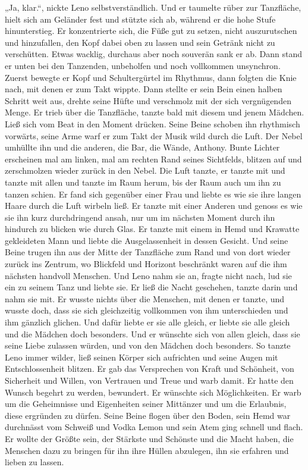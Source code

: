 \documentclass[ngerman,smalldemyvopaper,11pt,oneside,onecolumn,openright,extrafontsizes]{memoir}
\begin{document}
„Ja, klar.“, nickte Leno selbstverständlich. Und er taumelte rüber zur Tanzfläche, hielt sich am Geländer fest und stützte sich ab, während er die hohe Stufe hinunterstieg. Er konzentrierte sich, die Füße gut zu setzen, nicht auszurutschen und hinzufallen, den Kopf dabei oben zu lassen und sein Getränk nicht zu verschütten. Etwas wacklig, durchaus aber noch souverän sank er ab. Dann stand er unten bei den Tanzenden, unbeholfen und noch vollkommen unsynchron. Zuerst bewegte er Kopf und Schultergürtel im Rhythmus, dann folgten die Knie nach, mit denen er zum Takt wippte. Dann stellte er sein Bein einen halben Schritt weit aus, drehte seine Hüfte und verschmolz mit der sich vergnügenden Menge. Er trieb über die Tanzfläche, tanzte bald mit diesem und jenem Mädchen. Ließ sich vom Beat in den Moment drücken. Seine Beine schoben ihn rhythmisch vorwärts, seine Arme warf er zum Takt der Musik wild durch die Luft. Der Nebel umhüllte ihn und die anderen, die Bar, die Wände, Anthony. Bunte Lichter erscheinen mal am linken, mal am rechten Rand seines Sichtfelds, blitzen auf und zerschmolzen wieder zurück in den Nebel. Die Luft tanzte, er tanzte mit und tanzte mit allen und tanzte im Raum herum, bis der Raum auch um ihn zu tanzen schien. Er fand sich gegenüber einer Frau und liebte es wie sie ihre langen Haare durch die Luft wirbeln ließ. Er tanzte mit einer Anderen und genoss es wie sie ihn kurz durchdringend ansah, nur um im nächsten Moment durch ihn hindurch zu blicken wie durch Glas. Er tanzte mit einem in Hemd und Krawatte gekleideten Mann und liebte die Ausgelassenheit in dessen Gesicht. Und seine Beine trugen ihn aus der Mitte der Tanzfläche zum Rand und von dort wieder zurück ins Zentrum, wo Blickfeld und Horizont beschränkt waren auf die ihm nächsten handvoll Menschen. Und Leno nahm sie an, fragte nicht nach, lud sie ein zu seinem Tanz und liebte sie. Er ließ die Nacht geschehen, tanzte darin und nahm sie mit. Er wusste nichts über die Menschen, mit denen er tanzte, und wusste doch, dass sie sich gleichzeitig vollkommen von ihm unterschieden und ihm gänzlich glichen. Und dafür liebte er sie alle gleich, er liebte sie alle gleich und die Mädchen doch besonders. Und er wünschte sich von allen gleich, dass sie seine Liebe zulassen würden, und von den Mädchen doch besonders. So tanzte Leno immer wilder, ließ seinen Körper sich aufrichten und seine Augen mit Entschlossenheit blitzen. Er gab das Versprechen von Kraft und Schönheit, von Sicherheit und Willen, von Vertrauen und Treue und warb damit. Er hatte den Wunsch begehrt zu werden, bewundert. Er wünschte sich Möglichkeiten. Er warb um die Geheimnisse und Eigenheiten seiner Mittänzer und um die Erlaubnis, diese ergründen zu dürfen. Seine Beine flogen über den Boden, sein Hemd war durchnässt vom Schweiß und Vodka Lemon und sein Atem ging schnell und flach. Er wollte der Größte sein, der Stärkste und Schönste und die Macht haben, die Menschen dazu zu bringen für ihn ihre Hüllen abzulegen, ihn sie erfahren und lieben zu lassen.
\end{document}
